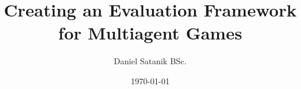 \newcommand{\iauthor}{Daniel Satanik BSc.}
\newcommand{\isupervisor}{DI Dr. Thomas St{\"u}tz BSc., Bakk.}
\newcommand{\imatrikel}{1410695007}
\newcommand{\ititle}{Creating an Evaluation Framework for Multiagent Games}
\newcommand{\ipapertype}{short paper 2}


\newcommand{\tattainment}{zur Erlangung des akademischen Grades}
\newcommand{\tdegree}{Master of Science}
\newcommand{\tauthor}{VerfasserIn}
\newcommand{\tsubmitted}{Vorgelegt am FH Masterstudiengang MultiMediaTechnology, Fachhochschule Salzburg}
\newcommand{\texamined}{Begutachtet durch}
\newcommand{\tsupervisor}{BetreuerIn}

\title{\ititle}
\author{\iauthor}


\date{\today}